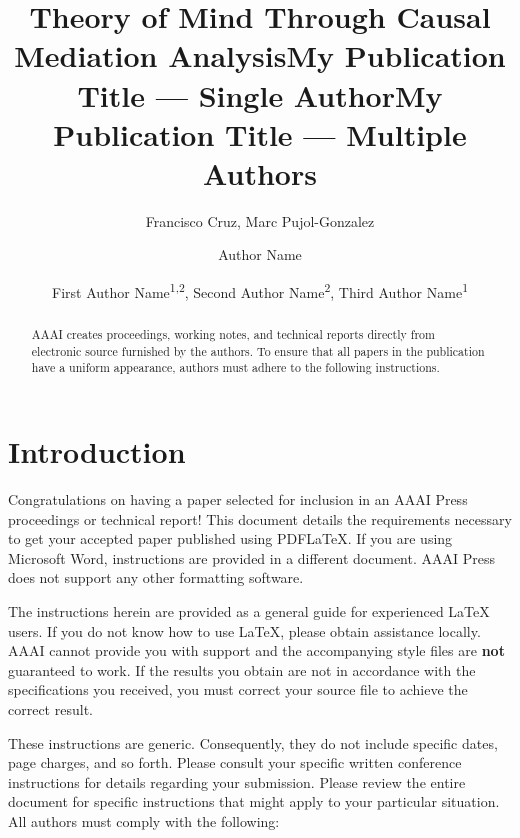 \documentclass[letterpaper]{article} %
\title{Theory of Mind Through Causal Mediation Analysis}
\author{
    Francisco Cruz\equalcontrib,
    Marc Pujol-Gonzalez\equalcontrib
}
\title{My Publication Title --- Single Author}
\author {
    Author Name
}
\title{My Publication Title --- Multiple Authors}
\author {
    First Author Name\textsuperscript{\rm 1,\rm 2},
    Second Author Name\textsuperscript{\rm 2},
    Third Author Name\textsuperscript{\rm 1}
}
\begin{document}
\maketitle

\begin{abstract}
AAAI creates proceedings, working notes, and technical reports directly from electronic source furnished by the authors. To ensure that all papers in the publication have a uniform appearance, authors must adhere to the following instructions.
\end{abstract}

\begin{links}
\end{links}

\section{Introduction}

Congratulations on having a paper selected for inclusion in an AAAI Press proceedings or technical report! This document details the requirements necessary to get your accepted paper published using PDF\LaTeX{}. If you are using Microsoft Word, instructions are provided in a different document. AAAI Press does not support any other formatting software.

The instructions herein are provided as a general guide for experienced \LaTeX{} users. If you do not know how to use \LaTeX{}, please obtain assistance locally. AAAI cannot provide you with support and the accompanying style files are \textbf{not} guaranteed to work. If the results you obtain are not in accordance with the specifications you received, you must correct your source file to achieve the correct result.

These instructions are generic. Consequently, they do not include specific dates, page charges, and so forth. Please consult your specific written conference instructions for details regarding your submission. Please review the entire document for specific instructions that might apply to your particular situation. All authors must comply with the following:
\end{document}
